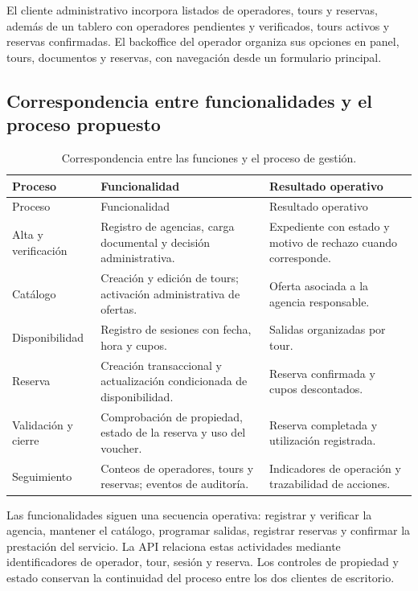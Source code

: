 El cliente administrativo incorpora listados de operadores, tours y reservas, además de un tablero con operadores pendientes y verificados, tours activos y reservas confirmadas. El backoffice del operador organiza sus opciones en panel, tours, documentos y reservas, con navegación desde un formulario principal.

\subsection{Correspondencia entre funcionalidades y el proceso propuesto}
\begin{longtable}{@{}P{3.05cm}P{5.05cm}P{4.2cm}@{}}
\caption{Correspondencia entre las funciones y el proceso de gestión.}\label{tab:trazabilidad}\\
\toprule Proceso & Funcionalidad & Resultado operativo \\ \midrule\endfirsthead
\toprule Proceso & Funcionalidad & Resultado operativo \\ \midrule\endhead
Alta y verificación & Registro de agencias, carga documental y decisión administrativa. & Expediente con estado y motivo de rechazo cuando corresponde. \\
Catálogo & Creación y edición de tours; activación administrativa de ofertas. & Oferta asociada a la agencia responsable. \\
Disponibilidad & Registro de sesiones con fecha, hora y cupos. & Salidas organizadas por tour. \\
Reserva & Creación transaccional y actualización condicionada de disponibilidad. & Reserva confirmada y cupos descontados. \\
Validación y cierre & Comprobación de propiedad, estado de la reserva y uso del voucher. & Reserva completada y utilización registrada. \\
Seguimiento & Conteos de operadores, tours y reservas; eventos de auditoría. & Indicadores de operación y trazabilidad de acciones. \\
\bottomrule
\end{longtable}

Las funcionalidades siguen una secuencia operativa: registrar y verificar la agencia, mantener el catálogo, programar salidas, registrar reservas y confirmar la prestación del servicio. La API relaciona estas actividades mediante identificadores de operador, tour, sesión y reserva. Los controles de propiedad y estado conservan la continuidad del proceso entre los dos clientes de escritorio.

